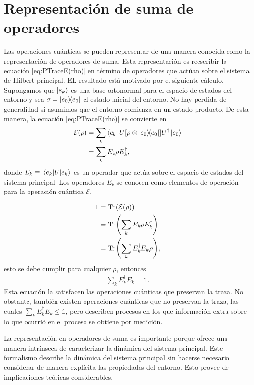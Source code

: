 \documentclass[11pt,dvipsnames]{report}
\newcommand{\E}{\mathcal{E}}
\newcommand{\Erho}{\mathcal{E}(\rho)}
\begin{document}
\section{Representación de suma de operadores}
Las operaciones cuánticas se pueden representar de una manera
conocida como la representación de operadores de suma. Esta
representación es reescribir la ecuación \eqref{eq:PTraceE(rho)}
en término de operadores que actúan sobre el sistema de Hilbert
principal. EL resultado está motivado por el siguiente cálculo. 
Supongamos que $\ket{e_k}$ es una base ortonormal para el
espacio de estados del entorno y sea $\sigma = \dyad{e_0}{e_0}$
el estado inicial del entorno. No hay perdida de generalidad si 
asumimos que el entorno comienza en un estado producto. De 
esta manera, la ecuación \eqref{eq:PTraceE(rho)} se convierte en
\begin{align*}
	\E (\rho) &= \sum _k \bra{e_k}U\qty[\rho \otimes \dyad{e_0}{e_0}]U^{\dagger}
	\ket{e_0} \\
						&= \sum _k E_k\rho E_k^{\dagger},
\end{align*}
donde $E_k\equiv \matrixel{e_k}{U}{e_k}$ es un operador que actúa
sobre el espacio de estados del sistema principal. Los operadores
$E_k$ se conocen como elementos de operación para la operación 
cuántica $\E$. 

\begin{align*}
	1 &= \Tr \qty(\Erho) \\
		&= \Tr \qty(\sum _k E_k\rho E_k^{\dagger}) \\
		&= \Tr \qty(\sum _k E_k^{\dagger}E_k \rho),
\end{align*}
esto se debe cumplir para cualquier $\rho$, entonces 
\begin{align}
	\sum _k E_k^{\dagger}E_k = \mathbb{1}.
\end{align}
Esta ecuación la satisfacen las operaciones cuánticas que preservan
la traza. No obstante, también existen operaciones cuánticas que 
no preservan la traza, las cuales $\sum _kE_k^{\dagger}E_k\leq \mathbb{1}$,
pero describen procesos en los que información extra sobre lo que ocurrió
en el proceso se obtiene por medición. 

La representación en operadores de suma es importante porque ofrece
una manera intrínseca de caracterizar la dinámica del sistema principal. 
Este formalismo describe la dinámica del sistema principal sin hacerse
necesario considerar de manera explícita las propiedades del entorno. 
Esto provee de implicaciones teóricas considerables. 
\end{document}
